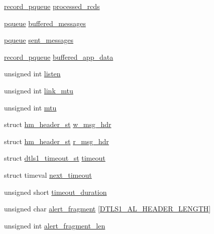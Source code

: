 \begin{DoxyCompactItemize}
\item 
\hyperlink{include_2openssl_2dtls1_8h_aac9fce3ec0c12051ecb4de0e531747f8}{record\+\_\+pqueue} \hyperlink{structdtls1__state__st_a987fed78e6be6e293938b2a5f5de5ab8}{processed\+\_\+rcds}
\item 
\hyperlink{crypto_2pqueue_2pqueue_8h_a9e7788165522481521851e337ac42054}{pqueue} \hyperlink{structdtls1__state__st_a671f1d488e8131fc6aa010b312067722}{buffered\+\_\+messages}
\item 
\hyperlink{crypto_2pqueue_2pqueue_8h_a9e7788165522481521851e337ac42054}{pqueue} \hyperlink{structdtls1__state__st_a8d96b850ae2d2931cf6ae828a0e43271}{sent\+\_\+messages}
\item 
\hyperlink{include_2openssl_2dtls1_8h_aac9fce3ec0c12051ecb4de0e531747f8}{record\+\_\+pqueue} \hyperlink{structdtls1__state__st_a3b9e5d3a9658a6a92596f38a866496d0}{buffered\+\_\+app\+\_\+data}
\item 
unsigned int \hyperlink{structdtls1__state__st_a80dcebe17d23329f3533f538a39e1d7c}{listen}
\item 
unsigned int \hyperlink{structdtls1__state__st_a081e7f420319f2dc1a3241b2885b6e02}{link\+\_\+mtu}
\item 
unsigned int \hyperlink{structdtls1__state__st_a5ac894ab93685970e62fbf6756f38309}{mtu}
\item 
struct \hyperlink{structhm__header__st}{hm\+\_\+header\+\_\+st} \hyperlink{structdtls1__state__st_a9c89ce6bcdd8f1fa5a0c08cf4a144fab}{w\+\_\+msg\+\_\+hdr}
\item 
struct \hyperlink{structhm__header__st}{hm\+\_\+header\+\_\+st} \hyperlink{structdtls1__state__st_a528ee70a8c3bef14e4642eb68ef2789a}{r\+\_\+msg\+\_\+hdr}
\item 
struct \hyperlink{structdtls1__timeout__st}{dtls1\+\_\+timeout\+\_\+st} \hyperlink{structdtls1__state__st_ab72af0e464da56aac628901682d8a443}{timeout}
\item 
struct timeval \hyperlink{structdtls1__state__st_a22ffd2a5e3eabfb4c818ea5c4ebfaa40}{next\+\_\+timeout}
\item 
unsigned short \hyperlink{structdtls1__state__st_a9478eed1bb889966680343127a248efa}{timeout\+\_\+duration}
\item 
unsigned char \hyperlink{structdtls1__state__st_a3f2696a0809a35636072682c4b2cf485}{alert\+\_\+fragment} \mbox{[}\hyperlink{ssl_2dtls1_8h_a0b67a04e169539f32cbc3c4951f4340a}{D\+T\+L\+S1\+\_\+\+A\+L\+\_\+\+H\+E\+A\+D\+E\+R\+\_\+\+L\+E\+N\+G\+TH}\mbox{]}
\item 
unsigned int \hyperlink{structdtls1__state__st_a549080e51b089972f50c13c3d2c0edf3}{alert\+\_\+fragment\+\_\+len}

\end{DoxyCompactItemize}
